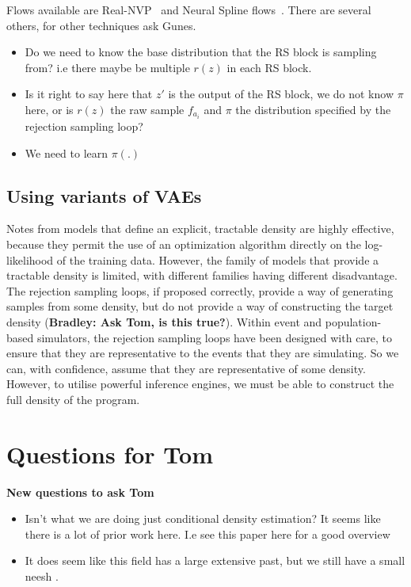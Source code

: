 \documentclass{article}
\begin{document}
Flows available are Real-NVP~\cite{dinh2016density} and Neural Spline flows~\cite{durkan2019neural}.
There are several others, for other techniques ask Gunes. 

\begin{itemize}
  \item Do we need to know the base distribution that the RS block is sampling from? i.e there maybe be multiple $r(z)$ in each 
  RS block. 
  \item Is it right to say here that $z\prime$ is the output of the RS block, we do not know $\pi$ here, or is $r(z)$ the raw sample $f_{a_i}$ and $\pi$ the distribution specified by the rejection sampling loop? 
  \item We need to learn $\pi(.)$
\end{itemize}
\subsection{Using variants of VAEs}

Notes from models that define an explicit,  
tractable density are highly effective, 
because they permit the use of an optimization algorithm directly on the log-likelihood of the training data.
However,  the  family  of  models  that provide  a  tractable  density  is  limited,
with  different  families  having  different disadvantage.
The rejection sampling loops, if proposed correctly, provide a way of generating 
samples from some density, but do not provide a way of constructing the target density (\textbf{Bradley: Ask Tom, is this true?}). 
Within event and population-based simulators, the rejection sampling loops have been designed with care,
to ensure that they are representative to the events that they are simulating. So we can, with confidence,
assume that they are representative of some density. 
However, to utilise powerful inference engines, we must be able to construct the 
full density of the program. 




\section{ Questions for Tom}

\textbf{New questions to ask Tom}

\begin{itemize}
  \item Isn't what we are doing just conditional density estimation? It seems
  like there is a lot of prior work here. I.e see this paper here for a good overview ~\cite{greenberg2019automatic}
  \item It does seem like this field has a large extensive past, but we still have a small neesh .
\end{itemize}
\end{document}
